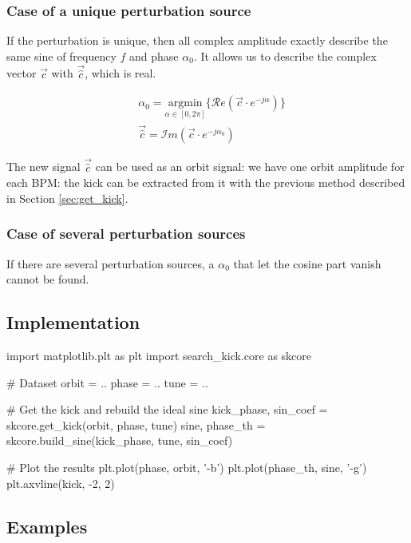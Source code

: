\subsubsection{Case of a unique perturbation source}

If the perturbation is unique, then all complex amplitude exactly describe the same sine of frequency $f$ and phase $\alpha_0$. It allows us to describe the complex vector $\vec{c}$ with $\vec{\hat{c}}$, which is real.

\begin{align}
&\alpha_0 = \underset{\alpha \in [0, 2\pi]}{\textrm{argmin}}\{\mathcal{R}e (\vec{c} \cdot e^{-j\alpha}) \} \\
&\vec{\hat{c}} = \mathcal{I}m (\vec{c} \cdot e^{-j\alpha_0})
\end{align}

The new signal $\vec{\hat{c}}$ can be used as an orbit signal: we have one orbit amplitude for each BPM: the kick can be extracted from it with the previous method described in Section \ref{sec:get_kick}.


\subsubsection{Case of several perturbation sources}
If there are several perturbation sources, a $\alpha_0$ that let the cosine part vanish cannot be found. 


\subsection{Implementation}
\begin{python}[caption=Get the kick]
	import matplotlib.plt as plt
	import search_kick.core as skcore
	
	# Dataset
	orbit = ..
	phase = ..
	tune = ..
	
	# Get the kick and rebuild the ideal sine
	kick_phase, sin_coef = skcore.get_kick(orbit, phase, tune)
	sine, phase_th = skcore.build_sine(kick_phase, tune, sin_coef)
	
	# Plot the results
	plt.plot(phase, orbit, '-b')
	plt.plot(phase_th, sine, '-g')
	plt.axvline(kick, -2, 2)	
\end{python}


\subsection{Examples}

